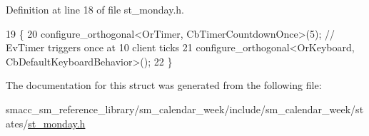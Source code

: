 Definition at line 18 of file st\+\_\+monday.\+h.


\begin{DoxyCode}
19     \{
20         configure\_orthogonal<OrTimer, CbTimerCountdownOnce>(5); \textcolor{comment}{// EvTimer triggers once at 10 client ticks}
21         configure\_orthogonal<OrKeyboard, CbDefaultKeyboardBehavior>();
22     \}
\end{DoxyCode}


The documentation for this struct was generated from the following file\+:\begin{DoxyCompactItemize}
\item 
smacc\+\_\+sm\+\_\+reference\+\_\+library/sm\+\_\+calendar\+\_\+week/include/sm\+\_\+calendar\+\_\+week/states/\hyperlink{sm__calendar__week_2include_2sm__calendar__week_2states_2st__monday_8h}{st\+\_\+monday.\+h}\end{DoxyCompactItemize}
